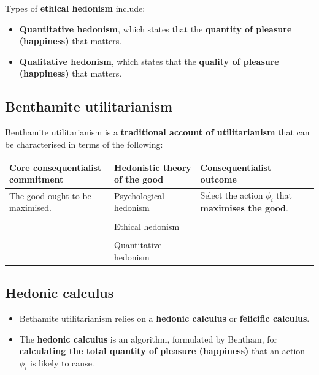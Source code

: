 \documentclass[11pt]{article}
\begin{document}
Types of \textbf{ethical hedonism} include:
\begin{itemize}
\item \textbf{Quantitative hedonism}, which states that the \textbf{quantity of pleasure (happiness)} that matters.
\item \textbf{Qualitative hedonism}, which states that the \textbf{quality of pleasure (happiness)} that matters.
\end{itemize}
\subsection{Benthamite utilitarianism}
\label{sec:org4c600be}
Benthamite utilitarianism is a \textbf{traditional account of utilitarianism} that can be characterised in terms of the following:
\begin{center}
\begin{tabularx}{\textwidth}{|X|X|X|}
\hline
Core consequentialist commitment & Hedonistic theory of the good & Consequentialist outcome\\
\hline
The good ought to be maximised. & Psychological hedonism & Select the action \(\phi_i\) that \textbf{maximises the good}.\\
 &  & \\
 & Ethical hedonism & \\
 &  & \\
 & Quantitative hedonism & \\
\hline
\end{tabularx}
\end{center}
\subsection{Hedonic calculus}
\label{sec:orgf699ad1}
\begin{itemize}
\item Bethamite utilitarianism relies on a \textbf{hedonic calculus} or \textbf{felicific calculus}.
\item The \textbf{hedonic calculus} is an algorithm, formulated by Bentham, for \textbf{calculating the total quantity of pleasure (happiness)} that an action \(\phi_i\) is likely to cause.
\end{itemize}
\end{document}
